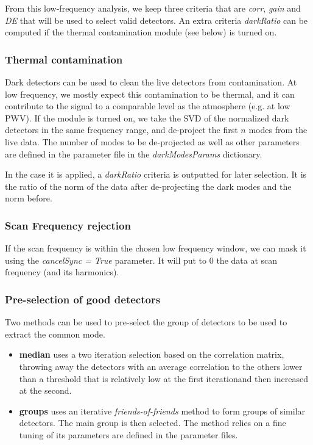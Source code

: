 \documentclass[a4paper, 11pt]{article}
\begin{document}
From this low-frequency analysis, we keep three criteria that are \emph{corr}, \emph{gain} and \emph{DE} that will be used to select valid detectors. An extra criteria  \emph{darkRatio} can be computed if the thermal contamination module (see below) is turned on.


\subsubsection*{Thermal contamination}
Dark detectors can be used to clean the live detectors from contamination. At low frequency, we mostly expect this contamination to be thermal, and it can contribute to the signal to a comparable level as the atmosphere (e.g. at low PWV). If the module is turned on, we take the SVD of the normalized dark detectors in the same frequency range, and de-project the first $n$ modes from the live data. The number of modes to be de-projected as well as other parameters are defined in the parameter file in the \emph{darkModesParams} dictionary.

In the case it is applied, a \emph{darkRatio} criteria is outputted for later selection. It is the ratio of the norm of the data after de-projecting the dark modes and the norm before.

\subsubsection*{Scan Frequency rejection}
If the scan frequency is within the chosen low frequency window, we can mask it using the \emph{cancelSync = True} parameter. It will put to $0$ the data at scan frequency (and its harmonics).

\subsubsection*{Pre-selection of good detectors}
Two methods can be used to pre-select the group of detectors to be used to extract the common mode.
\begin{itemize}
	\item \textbf{median} uses a two iteration selection based on the correlation matrix, throwing away the detectors with an average correlation to the others lower than a threshold that is relatively low at the first iterationand then increased at the second.
	\item \textbf{groups} uses an iterative \emph{friends-of-friends} method to form groups of similar detectors. The main group is then selected. The method relies on a fine tuning of its parameters are defined in the parameter files.
\end{itemize}
\end{document}
